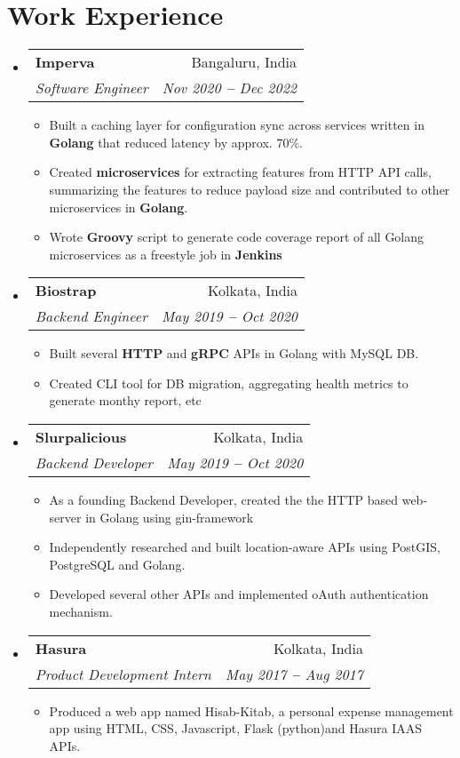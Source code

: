 \documentclass[letterpaper,11pt]{article}
\makeatletter
\newcommand{\resumeItem}[1]{
  \item\small{
    {#1 \vspace{-2pt}}
  }
}
\newcommand{\resumeSubheading}[4]{
  \vspace{-2pt}\item
    \begin{tabular*}{0.97\textwidth}[t]{l@{\extracolsep{\fill}}r}
      \textbf{#1} & #2 \\
      \textit{\small#3} & \textit{\small #4} \\
    \end{tabular*}\vspace{-7pt}
}
\newcommand{\resumeSubHeadingListStart}{\begin{itemize}[leftmargin=0.15in, label={}]}
\newcommand{\resumeSubHeadingListEnd}{\end{itemize}}
\newcommand{\resumeItemListStart}{\begin{itemize}}
\newcommand{\resumeItemListEnd}{\end{itemize}\vspace{-5pt}}
\makeatother
\begin{document}

\section{Work Experience}
  \vspace{3pt}
  \resumeSubHeadingListStart
    
    \resumeSubheading
      {Imperva}{Bangaluru, India}
      {Software Engineer}{Nov 2020 \textbf{--} Dec 2022}
        \resumeItemListStart
	    \resumeItem{Built a caching layer for configuration sync across services written in \textbf{Golang }that reduced latency by approx. 70\%.}
	    \resumeItem{Created \textbf{microservices} for extracting features from HTTP API calls, summarizing the features to reduce payload size and contributed to other microservices in \textbf{Golang}.}
	    \resumeItem{Wrote \textbf{Groovy} script to generate code coverage report of all Golang microservices as a freestyle job in \textbf{Jenkins}}
        \resumeItemListEnd
    
    \resumeSubheading
      {Biostrap}{Kolkata, India}
      {Backend Engineer}{May 2019 \textbf{--} Oct 2020}
        \resumeItemListStart
	    \resumeItem{Built several \textbf{HTTP }and \textbf{gRPC }APIs in Golang with MySQL DB.}
            \resumeItem{Created CLI tool for DB migration, aggregating health metrics to generate monthy report, etc}
        \resumeItemListEnd
    \resumeSubheading
      {Slurpalicious}{Kolkata, India}
      {Backend Developer}{May 2019 \textbf{--} Oct 2020}
        \resumeItemListStart
	    \resumeItem{As a founding Backend Developer, created the the HTTP based web-server in Golang using gin-framework}
            \resumeItem{Independently researched and built location-aware APIs using PostGIS, PostgreSQL and Golang.}
            \resumeItem{Developed several other APIs and implemented oAuth authentication mechanism.}
        \resumeItemListEnd
    \resumeSubheading
      {Hasura}{Kolkata, India}
      {Product Development Intern}{May 2017 \textbf{--} Aug 2017}
        \resumeItemListStart
	    \resumeItem{Produced a web app named Hisab-Kitab, a personal expense management app using HTML, CSS, Javascript, Flask (python)and Hasura IAAS APIs.}
        \resumeItemListEnd
    
  \resumeSubHeadingListEnd



\end{document}
